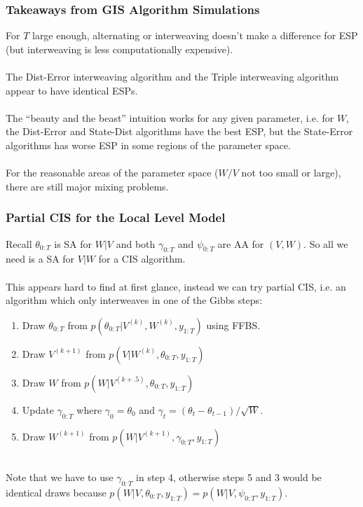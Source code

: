 \documentclass[xcolor=dvipsnames]{beamer}\usepackage{graphicx, color}
\begin{document}
\begin{frame}
  \frametitle{Takeaways from GIS Algorithm Simulations}
  For $T$ large enough, alternating or interweaving doesn't make a difference for ESP (but interweaving is less computationally expensive).\\~\\
  
  The Dist-Error interweaving algorithm and the Triple interweaving algorithm appear to have identical ESPs.\\~\\
\pause  
  The ``beauty and the beast'' intuition works for any given parameter, i.e. for $W$, the Dist-Error and State-Dist algorithms have the best ESP, but the State-Error algorithms has worse ESP in some regions of the parameter space.\\~\\
  
  For the reasonable areas of the parameter space ($W/V$ not too small or large), there are still major mixing problems.
\end{frame}

\begin{frame}
  \frametitle{Partial CIS for the Local Level Model}
  Recall $\theta_{0:T}$ is SA for $W|V$ and both $\gamma_{0:T}$ and $\psi_{0:T}$ are AA for $(V,W)$. So all we need is a SA for $V|W$ for a CIS algorithm.\\~\\
\pause  
  This appears hard to find at first glance, instead we can try partial CIS, i.e. an algorithm which only interweaves in one of the Gibbs steps:
  \begin{enumerate}
  \item Draw $\theta_{0:T}$ from $p(\theta_{0:T}|V^{(k)},W^{(k)},y_{1:T})$ using FFBS.
  \item Draw $V^{(k+1)}$ from $p(V|W^{(k)},\theta_{0:T},y_{1:T})$
  \item Draw $W$ from $p(W|V^{(k+.5)},\theta_{0:T},y_{1:T})$
  \item Update $\gamma_{0:T}$ where $\gamma_0=\theta_0$ and $\gamma_t=(\theta_t-\theta_{t-1})/\sqrt{W}$.
  \item Draw $W^{(k+1)}$ from $p(W|V^{(k+1)},\gamma_{0:T},y_{1:T})$\\~\\
  \end{enumerate}
  Note that we have to use $\gamma_{0:T}$ in step 4, otherwise steps 5 and 3 would be identical draws because $p(W|V,\theta_{0:T},y_{1:T})=p(W|V,\psi_{0:T},y_{1:T})$.
\end{frame}
\end{document}
